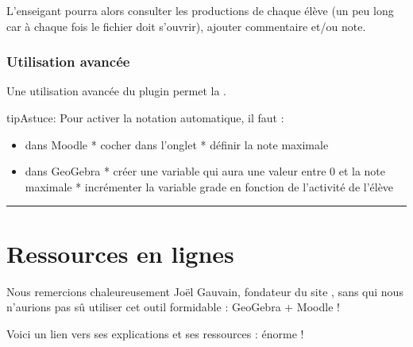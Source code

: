 \documentclass[letterpaper,10pt,french]{sphinxmanual}
\begin{document}
L’enseigant pourra alors consulter les productions de chaque élève (un peu long car
à chaque fois le fichier doit s’ouvrir), ajouter commentaire et/ou note.


\subsubsection{Utilisation avancée}
\label{\detokenize{projet-description:utilisation-avancee}}
Une utilisation avancée du plugin permet la .

\begin{sphinxadmonition}{tip}{Astuce:}
Pour activer la notation automatique, il faut :
\begin{itemize}
\item {} 
dans Moodle
* cocher  dans l’onglet 
* définir la note maximale

\item {} 
dans GeoGebra
* créer une variable  qui aura une valeur entre 0 et la note maximale
* incrémenter la variable grade en fonction de l’activité de l’élève

\end{itemize}

\noindent{}

\end{sphinxadmonition}


\bigskip\hrule\bigskip



\section{Ressources en lignes}
\label{\detokenize{projet-ressources:ressources-en-lignes}}\label{\detokenize{projet-ressources::doc}}
Nous remercions chaleureusement Joël Gauvain, fondateur du site , sans qui nous n’aurions pas sû utiliser cet outil formidable : GeoGebra + Moodle !

Voici un lien vers ses explications et ses ressources : énorme !

\end{document}
